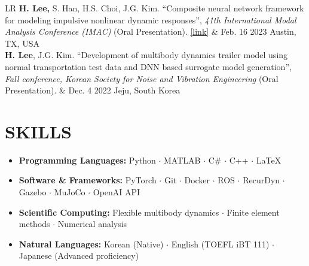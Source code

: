 \documentclass[a4paper,10pt]{extarticle}
\begin{document}
\begin{longtable}{LR}
	\textbf{H. Lee,} S. Han, H.S. Choi, J.G. Kim. “Composite neural network framework for modeling impulsive nonlinear dynamic responses”, \textit{41th International Modal Analysis Conference (IMAC)} (Oral Presentation). \href{https://link.springer.com/chapter/10.1007/978-3-031-34946-1_21}{\color{blue}[link]}                                                                                                                                              & {Feb. 16 2023 \linebreak  Austin, TX, USA}    \\
	\textbf{H. Lee}, J.G. Kim. “Development of multibody dynamics trailer model using normal transportation test data and DNN based surrogate model generation”, \textit{Fall conference, Korean Society for Noise and Vibration Engineering} (Oral Presentation).                                                                                                                                                                                                  & {Dec. 4 2022 \linebreak Jeju, South Korea}    \\
\end{longtable}

\section*{SKILLS}
\begin{itemize}
	\item \textbf{Programming Languages: }Python $\cdot$ MATLAB $\cdot$ C\# $\cdot$ C++ $\cdot$ \LaTeX
	\item \textbf{Software \& Frameworks: }PyTorch $\cdot$ Git $\cdot$ Docker $\cdot$ ROS $\cdot$ RecurDyn $\cdot$ Gazebo $\cdot$ MuJoCo $\cdot$ OpenAI API
	\item \textbf{Scientific Computing: }Flexible multibody dynamics $\cdot$ Finite element methods $\cdot$ Numerical analysis
	\item \textbf{Natural Languages: }Korean (Native) $\cdot$ English (TOEFL iBT 111) $\cdot$ Japanese (Advanced proficiency)
\end{itemize}
\end{document}
